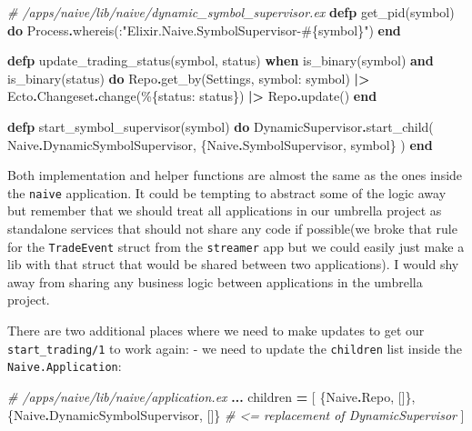 \documentclass[
  oneside]{book}
\newenvironment{Shaded}{\begin{snugshade}}{\end{snugshade}}
\newcommand{\CommentTok}[1]{\textcolor[rgb]{0.56,0.35,0.01}{\textit{#1}}}
\newcommand{\ConstantTok}[1]{\textcolor[rgb]{0.00,0.00,0.00}{#1}}
\newcommand{\KeywordTok}[1]{\textcolor[rgb]{0.13,0.29,0.53}{\textbf{#1}}}
\newcommand{\NormalTok}[1]{#1}
\newcommand{\OperatorTok}[1]{\textcolor[rgb]{0.81,0.36,0.00}{\textbf{#1}}}
\newcommand{\OtherTok}[1]{\textcolor[rgb]{0.56,0.35,0.01}{#1}}
\newcommand{\StringTok}[1]{\textcolor[rgb]{0.31,0.60,0.02}{#1}}
\newcommand{\VariableTok}[1]{\textcolor[rgb]{0.00,0.00,0.00}{#1}}
\begin{document}
\begin{Shaded}
\begin{Highlighting}[]
\CommentTok{\# /apps/naive/lib/naive/dynamic\_symbol\_supervisor.ex}
  \KeywordTok{defp}\NormalTok{ get\_pid(symbol) }\KeywordTok{do}
    \ConstantTok{Process}\OperatorTok{.}\NormalTok{whereis(:}\StringTok{"Elixir.Naive.SymbolSupervisor{-}}\OtherTok{\#\{}\NormalTok{symbol}\OtherTok{\}}\StringTok{"}\NormalTok{)}
  \KeywordTok{end}

  \KeywordTok{defp}\NormalTok{ update\_trading\_status(symbol, status)}
       \KeywordTok{when}\NormalTok{ is\_binary(symbol) }\KeywordTok{and}\NormalTok{ is\_binary(status) }\KeywordTok{do}
    \ConstantTok{Repo}\OperatorTok{.}\NormalTok{get\_by(}\ConstantTok{Settings}\NormalTok{, }\VariableTok{symbol:}\NormalTok{ symbol)}
    \OperatorTok{|\textgreater{}} \ConstantTok{Ecto}\OperatorTok{.}\ConstantTok{Changeset}\OperatorTok{.}\NormalTok{change(\%\{}\VariableTok{status:}\NormalTok{ status\})}
    \OperatorTok{|\textgreater{}} \ConstantTok{Repo}\OperatorTok{.}\NormalTok{update()}
  \KeywordTok{end}

  \KeywordTok{defp}\NormalTok{ start\_symbol\_supervisor(symbol) }\KeywordTok{do}
    \ConstantTok{DynamicSupervisor}\OperatorTok{.}\NormalTok{start\_child(}
      \ConstantTok{Naive}\OperatorTok{.}\ConstantTok{DynamicSymbolSupervisor}\NormalTok{,}
\NormalTok{      \{}\ConstantTok{Naive}\OperatorTok{.}\ConstantTok{SymbolSupervisor}\NormalTok{, symbol\}}
\NormalTok{    )}
  \KeywordTok{end}
\end{Highlighting}
\end{Shaded}

Both implementation and helper functions are almost the same as the ones inside the \texttt{naive} application. It could be tempting to abstract some of the logic away but remember that we should treat all applications in our umbrella project as standalone services that should not share any code if possible(we broke that rule for the \texttt{TradeEvent} struct from the \texttt{streamer} app but we could easily just make a lib with that struct that would be shared between two applications). I would shy away from sharing any business logic between applications in the umbrella project.

There are two additional places where we need to make updates to get our \texttt{start\_trading/1} to work again:
- we need to update the \texttt{children} list inside the \texttt{Naive.Application}:

\begin{Shaded}
\begin{Highlighting}[]
\CommentTok{\# /apps/naive/lib/naive/application.ex}
    \OperatorTok{...}
\NormalTok{    children }\OperatorTok{=}\NormalTok{ [}
\NormalTok{      \{}\ConstantTok{Naive}\OperatorTok{.}\ConstantTok{Repo}\NormalTok{, []\},}
\NormalTok{      \{}\ConstantTok{Naive}\OperatorTok{.}\ConstantTok{DynamicSymbolSupervisor}\NormalTok{, []\} }\CommentTok{\# \textless{}= replacement of DynamicSupervisor}
\NormalTok{    ]}
\end{Highlighting}
\end{Shaded}
\end{document}
